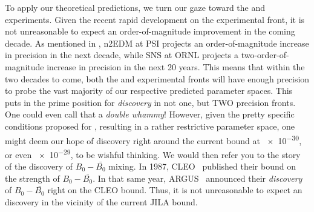 To apply our theoretical predictions, we turn our gaze toward the {\eedm} and {\nedm} experiments.
Given the recent rapid development on the {\eedm} experimental front, 
it is not unreasonable to expect an order-of-magnitude improvement in the coming decade.
As mentioned in , 
n2EDM at PSI projects an order-of-magnitude increase in precision in the next decade,
while SNS at ORNL projects a two-order-of-magnitude increase in precision in the next 20 years.
This means that within the two decades to come,
both the {\eedm} and {\nedm} experimental fronts will have enough precision to probe the vast majority of our respective predicted {\gthdm} parameter spaces.
This puts {\gthdm} in the prime position for \emph{discovery} in not one, but TWO precision fronts.
One could even call that a \emph{double whammy}!
However, given the pretty specific conditions proposed for {\eedm}, 
resulting in a rather restrictive parameter space,
one might deem our hope of discovery right around the current bound at \num{e-30}, or even \num{e-29},
to be wishful thinking.
We would then refer you to the story of the discovery of \(B_{0} - \bar{B_{0}} \) mixing.
In 1987, CLEO~\cite{CLEO1987BBbarMixing} published their bound on the strength of \(B_{0} - \bar{B_{0}} \).
In that same year, ARGUS~\cite{ARGUS1987BBbarMixing} announced their \emph{discovery} of \(B_{0} - \bar{B_{0}} \) right on the CLEO bound.
Thus, it is not unreasonable to expect an {\eedm} discovery in the vicinity of the current JILA bound.

\clearpage
